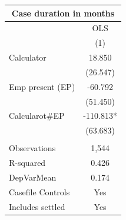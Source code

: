 \begin{tabular}{lc}
\toprule
\multicolumn{2}{c}{Case duration in months} \\
\midrule
      & OLS \\
\midrule
      & (1) \\
\midrule
Calculator & 18.850 \\
      & (26.547) \\
Emp present (EP) & -60.792 \\
      & (51.450) \\
Calcularot\#EP & -110.813* \\
      & (63.683) \\
      &  \\
\midrule
Observations  & 1,544 \\
R-squared & 0.426 \\
DepVarMean & 0.174 \\
Casefile Controls & Yes \\
Includes settled & Yes \\
\bottomrule
\bottomrule
\end{tabular}%
